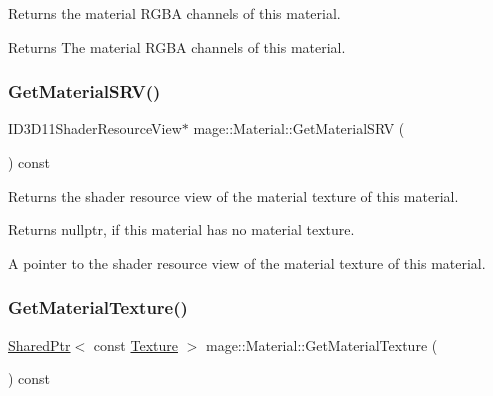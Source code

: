 Returns the material R\+G\+BA channels of this material.

\begin{DoxyReturn}{Returns}
The material R\+G\+BA channels of this material. 
\end{DoxyReturn}
\hypertarget{structmage_1_1_material_a0675c4bbbdb48c0db9bf82fffb073094}{}\label{structmage_1_1_material_a0675c4bbbdb48c0db9bf82fffb073094} 
\subsubsection{\texorpdfstring{Get\+Material\+S\+R\+V()}{GetMaterialSRV()}}
{\footnotesize\ttfamily I\+D3\+D11\+Shader\+Resource\+View$\ast$ mage\+::\+Material\+::\+Get\+Material\+S\+RV (\begin{DoxyParamCaption}{ }\end{DoxyParamCaption}) const\hspace{0.3cm}{\ttfamily [noexcept]}}

Returns the shader resource view of the material texture of this material.

\begin{DoxyReturn}{Returns}
{\ttfamily nullptr}, if this material has no material texture. 

A pointer to the shader resource view of the material texture of this material. 
\end{DoxyReturn}
\hypertarget{structmage_1_1_material_aa8accf832423420f6b2ed4b50ef394b3}{}\label{structmage_1_1_material_aa8accf832423420f6b2ed4b50ef394b3} 
\subsubsection{\texorpdfstring{Get\+Material\+Texture()}{GetMaterialTexture()}}
{\footnotesize\ttfamily \hyperlink{namespacemage_a1e01ae66713838a7a67d30e44c67703e}{Shared\+Ptr}$<$ const \hyperlink{classmage_1_1_texture}{Texture} $>$ mage\+::\+Material\+::\+Get\+Material\+Texture (\begin{DoxyParamCaption}{ }\end{DoxyParamCaption}) const\hspace{0.3cm}{\ttfamily [noexcept]}}

